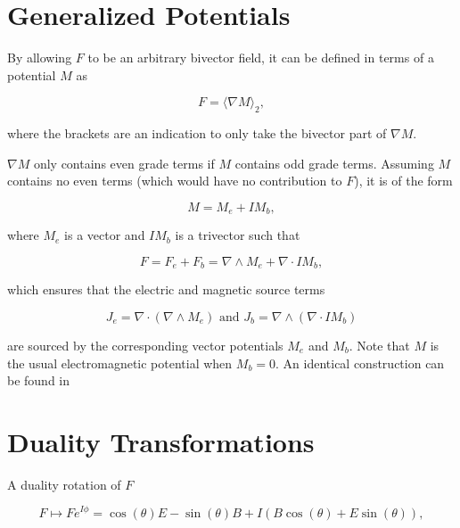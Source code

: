 \documentclass{article}
\begin{document}
  \section{Generalized Potentials}

  By allowing $F$ to be an arbitrary bivector field, it can be defined in terms of a potential $M$ as

  \begin{equation}
    F = \langle \nabla M \rangle_2,
  \end{equation}

  where the brackets are an indication to only take the bivector part of $\nabla M$.

  $\nabla M$ only contains even grade terms if $M$ contains odd grade terms. Assuming $M$ contains no even terms (which would have no contribution to $F$), it is of the form

  \begin{equation}
    M = M_e + I M_b, \label{eq:potential}
  \end{equation}

   where $M_e$ is a vector and $I M_b$ is a trivector such that

  \begin{equation}
    F = F_e + F_b = \nabla \wedge M_e + \nabla \cdot I M_b,
  \end{equation}

  which ensures that the electric and magnetic source terms 

  \begin{equation}
    J_e = \nabla \cdot (\nabla \wedge M_e) \text{ and } J_b = \nabla \wedge (\nabla \cdot I M_b)
  \end{equation} 

  are sourced by the corresponding vector potentials $M_e$ and $M_b$. Note that $M$ is the usual electromagnetic potential when $M_b = 0$. An identical construction can be found in \cite{dressel}

  \section{Duality Transformations}

  A duality rotation of $F$

  \begin{equation}
    F \mapsto F e^{I \phi} = \cos(\theta) E - \sin(\theta) B + I(B \cos(\theta) + E \sin(\theta)),\label{eq:duality}
  \end{equation}
\end{document}
